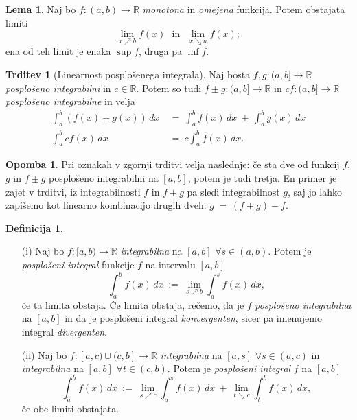 \documentclass[11pt]{article}
\theoremstyle{definition}
\newtheorem{definicija}{Definicija}[section]
\theoremstyle{definition}
\newtheorem{trditev}{Trditev}[section]
\theoremstyle{definition}
\theoremstyle{theorem}
\newtheorem{lema}{Lema}
\newtheorem*{opomba}{Opomba}
\begin{document}
\begin{lema}

Naj bo $f:(a, b) \rightarrow \mathbb{R}$ \textit{monotona} in \textit{omejena} funkcija. Potem obstajata limiti
$$\lim_{x \nearrow b} f(x) ~~~\text{in}~~~ \lim_{x \searrow a} f(x);$$
ena od teh limit je enaka $\sup{f}$, druga pa $\inf{f}$.

\end{lema}
\vspace{0.5cm}

\begin{trditev}[Linearnost posplošenega integrala]

Naj bosta \hbox{$f,g: (a, b] \rightarrow \mathbb{R}$} \textit{posplošeno integrabilni} in $c \in \mathbb{R}$. Potem so tudi $f \pm g:(a, b] \rightarrow \mathbb{R}$ in $cf:(a, b] \rightarrow \mathbb{R}$ \textit{posplošeno integrabilne} in velja 
\begin{align*}
\int_a^b \left( f(x) \pm g(x) \right)\,dx ~&=~ \int_a^b f(x)\,dx ~\pm~ \int_a^b g(x)\,dx \\
\int_a^b c f(x)\,dx ~&=~ c \int_a^b f(x)\,dx.
\end{align*}

\end{trditev}
\vspace{0.5cm}

\begin{opomba}

Pri oznakah v zgornji trditvi velja naslednje: če sta dve od funkcij $f$, $g$ in $f \pm g$ posplošeno integrabilni na $[a, b]$, potem je tudi tretja. En primer je zajet v trditvi, iz integrabilnosti $f$ in $f+g$ pa sledi integrabilnost $g$, saj jo lahko zapišemo kot linearno kombinacijo drugih dveh: $g ~=~ (f+g) - f$.

\end{opomba}
\vspace{0.5cm}

\begin{definicija}
~
\begin{enumerate}

	\item[(i)] Naj bo $f:[a, b) \rightarrow \mathbb{R}$ \textit{integrabilna} na $[a, b]$ $\forall s \in (a, b)$. Potem je \textit{posplošeni integral} funkcije $f$ na intervalu $[a, b]$
	$$\int_a^b f(x)\,dx ~:=~ \lim_{s \nearrow b} \int_a^s f(x)\,dx,$$
	če ta limita obstaja. Če limita obstaja, rečemo, da je $f$ \textit{posplošeno integrabilna} na $[a, b]$ in da je posplošeni integral \textit{konvergenten}, sicer pa imenujemo integral \textit{divergenten}.
	
	\item[(ii)]	Naj bo $f:[a, c) \cup (c, b] \rightarrow \mathbb{R}$ \textit{integrabilna} na $[a, s]$ $\forall s \in (a, c)$ in \textit{integrabilna} na $[a, b]$ $\forall t \in (c, b)$. Potem je \textit{posplošeni integral} $f$ na $[a, b]$
	$$\int_a^b f(x)\,dx ~:=~ \lim_{s \nearrow c} \int_a^s f(x)\,dx ~+~ \lim_{t \searrow c} \int_t^b f(x)\,dx,$$
 če obe limiti obstajata.	
 
\end{enumerate}
\end{definicija}
\vspace{0.5cm}
\end{document}
